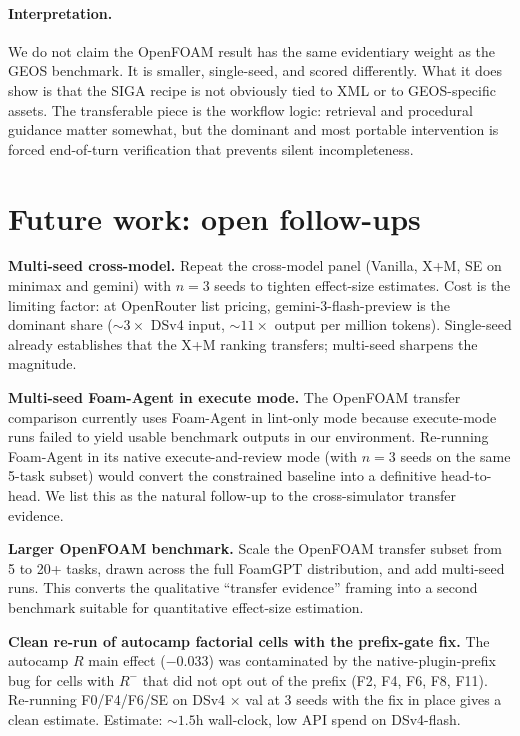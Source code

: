 \documentclass{article}
\begin{document}
\paragraph{Interpretation.}
We do not claim the OpenFOAM result has the same evidentiary weight as the GEOS benchmark. It is smaller, single-seed, and scored differently. What it does show is that the SIGA recipe is not obviously tied to XML or to GEOS-specific assets. The transferable piece is the workflow logic: retrieval and procedural guidance matter somewhat, but the dominant and most portable intervention is forced end-of-turn verification that prevents silent incompleteness.

\section{Future work: open follow-ups}
\label{app:future-work}

\textbf{Multi-seed cross-model.} Repeat the cross-model panel (Vanilla, X+M, SE on minimax and gemini) with $n=3$ seeds to tighten effect-size estimates. Cost is the limiting factor: at OpenRouter list pricing, gemini-3-flash-preview is the dominant share (${\sim}3\times$ DSv4 input, ${\sim}11\times$ output per million tokens). Single-seed already establishes that the X+M ranking transfers; multi-seed sharpens the magnitude.

\textbf{Multi-seed Foam-Agent in execute mode.} The OpenFOAM transfer comparison currently uses Foam-Agent in lint-only mode because execute-mode runs failed to yield usable benchmark outputs in our environment. Re-running Foam-Agent in its native execute-and-review mode (with $n=3$ seeds on the same 5-task subset) would convert the constrained baseline into a definitive head-to-head. We list this as the natural follow-up to the cross-simulator transfer evidence.

\textbf{Larger OpenFOAM benchmark.} Scale the OpenFOAM transfer subset from 5 to 20+ tasks, drawn across the full FoamGPT distribution, and add multi-seed runs. This converts the qualitative ``transfer evidence'' framing into a second benchmark suitable for quantitative effect-size estimation.

\textbf{Clean re-run of autocamp factorial cells with the prefix-gate fix.} The autocamp $R$ main effect ($-0.033$) was contaminated by the native-plugin-prefix bug for cells with $R^{-}$ that did not opt out of the prefix (F2, F4, F6, F8, F11). Re-running F0/F4/F6/SE on DSv4 × val at 3 seeds with the fix in place gives a clean estimate. Estimate: ${\sim}1.5$h wall-clock, low API spend on DSv4-flash.
\end{document}
